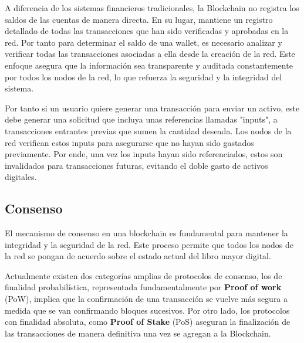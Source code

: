 
A diferencia de los sistemas financieros tradicionales, la Blockchain no registra los saldos de las cuentas de manera directa. En su lugar, mantiene un registro detallado de todas las transacciones que han sido verificadas y aprobadas en la red.
Por tanto para determinar el saldo de una wallet, es necesario analizar y verificar todas las transacciones asociadas a ella desde la creación de la red. Este enfoque asegura que la información sea transparente y auditada constantemente por todos los nodos de la red, lo que refuerza la seguridad y la integridad del sistema.

Por tanto si un usuario quiere generar una transacción para enviar un activo, este debe generar una solicitud que incluya unas referencias llamadas "inputs", a transacciones entrantes previas que sumen la cantidad deseada. Los nodos de la red verifican estos inputs para asegurarse que no hayan sido gastados previamente.
Por ende, una vez los inputs hayan sido referenciados, estos son invalidados para transacciones futuras, evitando el doble gasto de activos digitales.


\subsection{Consenso}

El mecanismo de consenso en una blockchain es fundamental para mantener la integridad y la seguridad de la red. Este proceso permite que todos los nodos de la red se pongan de acuerdo sobre el estado actual del libro mayor digital.

Actualmente existen dos categorías amplias de protocolos de consenso, los de finalidad probabilística, representada fundamentalmente por \textbf{Proof of work} (PoW), implica que la confirmación de una transacción se vuelve más segura a medida que se van confirmando bloques sucesivos.
Por otro lado, los protocolos con finalidad absoluta, como \textbf{Proof of Stake} (PoS) aseguran la finalización de las transacciones de manera definitiva una vez se agregan a la Blockchain.

